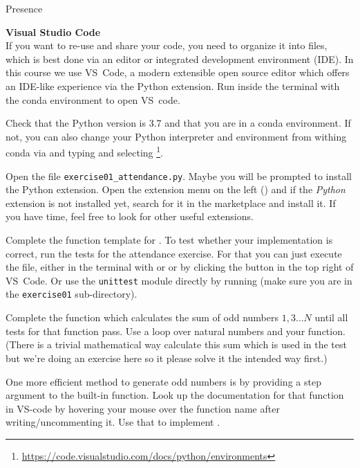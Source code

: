 \documentclass[a4paper, draft=False]{scrartcl}
\begin{document}
\begin{exam}[Presence]{Presence}
\begin{instructions}
        \begin{problem*}\textbf{Visual Studio Code}\\
          If you want to re-use and share your code, you need to organize it into
          files, which is best done via an editor or integrated development
          environment (IDE). In this course we use VS~Code, a modern extensible open
          source editor which offers an IDE-like experience via the Python extension.
          Run  inside the terminal with the conda environment to open
          VS~code.
          \begin{parts}
          \item Check that the Python
            version is 3.7 and that you are in a conda environment. If not, you can
            also change your Python interpreter and environment from withing conda
            via  and typing and selecting \footnote{\url{https://code.visualstudio.com/docs/python/environments}}.
          \item Open the file \texttt{exercise01\_attendance.py}. Maybe you will be
            prompted to install the Python extension. Open the extension
            menu on the left () and if the \emph{Python} extension is
            not installed yet, search for it in the marketplace and install it.
            If you have time, feel free to look for other useful extensions.
          \item Complete the function template for . To test whether
            your implementation is correct, run the tests for the attendance
            exercise. For that you can just execute the file, either in the terminal
            with  or or by clicking the
            \menu{$\triangleright$} button in the top right of VS~Code. Or use the
            \texttt{unittest} module directly by running 
            (make sure you are in the \texttt{exercise01} sub-directory).
          \item Complete the function  which calculates the
            sum of odd numbers $1, 3 \ldots N$ until all tests for that function
            pass. Use a  loop over natural numbers and your 
            function. (There is a trivial mathematical way calculate this sum which
            is used in the test but we're doing an exercise here so it please solve
            it the intended way first.)
          \item One more efficient method to generate odd numbers is by providing a
            step argument to the built-in  function. Look up the
            documentation for that function in VS-code by hovering your mouse over
            the function name after writing/uncommenting it. Use that to implement
            .
          \end{parts}
        \end{problem*}


\end{instructions}
\end{exam}
\end{document}
